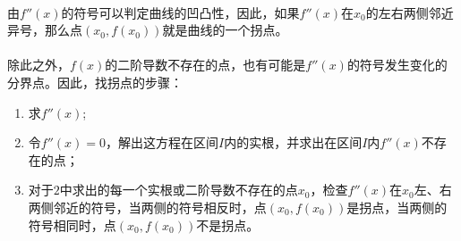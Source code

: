 \paragraph{}
由$f''(x)$的符号可以判定曲线的凹凸性，因此，如果$f''(x)$在$x_0$的左右两侧邻近异号，那么点$(x_0,f(x_0))$就是曲线的一个拐点。

\paragraph{}
除此之外，$f(x)$的二阶导数不存在的点，也有可能是$f''(x)$的符号发生变化的分界点。因此，找拐点的步骤：
\begin{enumerate}
  \item 求$f''(x)$;
  \item 令$f''(x)=0$，解出这方程在区间$I$内的实根，并求出在区间$I$内$f''(x)$不存在的点；
  \item 对于$2$中求出的每一个实根或二阶导数不存在的点$x_0$，检查$f''(x)$在$x_0$左、右两侧邻近的符号，当两侧的符号相反时，点$(x_0,f(x_0))$是拐点，当两侧的符号相同时，点$(x_0,f(x_0))$不是拐点。
\end{enumerate}
